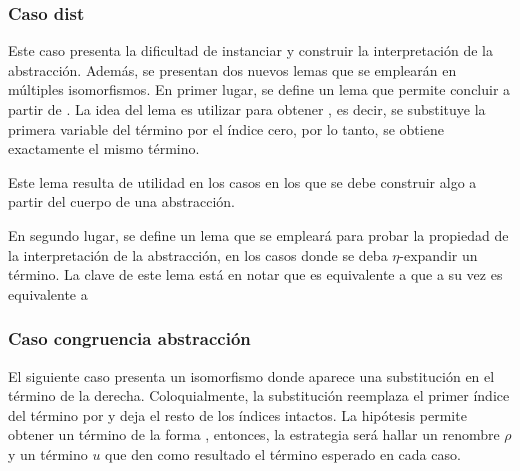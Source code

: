
\subsubsection{Caso dist}

Este caso presenta la dificultad de instanciar y construir la interpretación de la abstracción.
Además, se presentan dos nuevos lemas que se emplearán en múltiples isomorfismos.
En primer lugar, se define un lema que permite concluir \snstar{} a partir de \snstar {} .
La idea del lema es utilizar  para obtener
, es decir, se substituye la primera variable del término por el índice cero, por lo tanto, se obtiene exactamente el mismo término.



Este lema resulta de utilidad en los casos en los que se debe construir algo a partir del cuerpo de una abstracción.


En segundo lugar, se define un lema que se empleará para probar la propiedad de la interpretación de la abstracción, en los casos donde se deba $\eta$-expandir un término.
La clave de este lema está en notar que 
es equivalente a  que a su vez es equivalente a  \bound{$\rho$} 



\subsubsection{Caso congruencia abstracción}

El siguiente caso presenta un isomorfismo donde aparece una substitución en el término de la derecha.
Coloquialmente, la substitución  reemplaza el primer índice del término por
\const{[}  \const{]≡} 
y deja el resto de los índices intactos.
La hipótesis  permite obtener un término de la forma
\snstar
{}
, entonces, la estrategia será hallar un renombre $\rho$ y un término $u$ que den como resultado el término esperado en cada caso.

